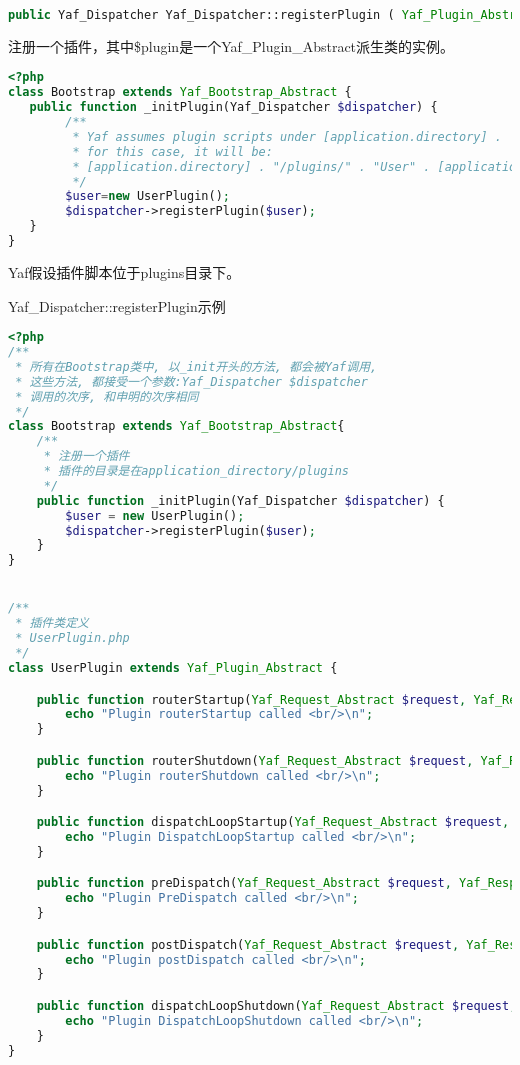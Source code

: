 \begin{lstlisting}[language=PHP]
public Yaf_Dispatcher Yaf_Dispatcher::registerPlugin ( Yaf_Plugin_Abstract $plugin )
\end{lstlisting}

注册一个插件，其中\$plugin是一个Yaf\_Plugin\_Abstract派生类的实例。




\begin{lstlisting}[language=PHP]
<?php
class Bootstrap extends Yaf_Bootstrap_Abstract {
   public function _initPlugin(Yaf_Dispatcher $dispatcher) {
        /**
         * Yaf assumes plugin scripts under [application.directory] .  "/plugins" 
         * for this case, it will be:
         * [application.directory] . "/plugins/" . "User" . [application.ext]
         */ 
        $user=new UserPlugin();
        $dispatcher->registerPlugin($user);
   }
}
\end{lstlisting}

Yaf假设插件脚本位于plugins目录下。

\begin{example}
Yaf\_Dispatcher::registerPlugin示例
\begin{lstlisting}[language=PHP]
<?php
/**
 * 所有在Bootstrap类中, 以_init开头的方法, 都会被Yaf调用,
 * 这些方法, 都接受一个参数:Yaf_Dispatcher $dispatcher
 * 调用的次序, 和申明的次序相同
 */
class Bootstrap extends Yaf_Bootstrap_Abstract{
    /**
     * 注册一个插件
     * 插件的目录是在application_directory/plugins
     */
    public function _initPlugin(Yaf_Dispatcher $dispatcher) {
        $user = new UserPlugin();
        $dispatcher->registerPlugin($user);
    }
}


/**
 * 插件类定义
 * UserPlugin.php
 */
class UserPlugin extends Yaf_Plugin_Abstract {

    public function routerStartup(Yaf_Request_Abstract $request, Yaf_Response_Abstract $response) {
        echo "Plugin routerStartup called <br/>\n";
    }

    public function routerShutdown(Yaf_Request_Abstract $request, Yaf_Response_Abstract $response) {
        echo "Plugin routerShutdown called <br/>\n";
    }

    public function dispatchLoopStartup(Yaf_Request_Abstract $request, Yaf_Response_Abstract $response) {
        echo "Plugin DispatchLoopStartup called <br/>\n";
    }

    public function preDispatch(Yaf_Request_Abstract $request, Yaf_Response_Abstract $response) {
        echo "Plugin PreDispatch called <br/>\n";
    }

    public function postDispatch(Yaf_Request_Abstract $request, Yaf_Response_Abstract $response) {
        echo "Plugin postDispatch called <br/>\n";
    }

    public function dispatchLoopShutdown(Yaf_Request_Abstract $request, Yaf_Response_Abstract $response) {
        echo "Plugin DispatchLoopShutdown called <br/>\n";
    }
}
\end{lstlisting}
\end{example}










